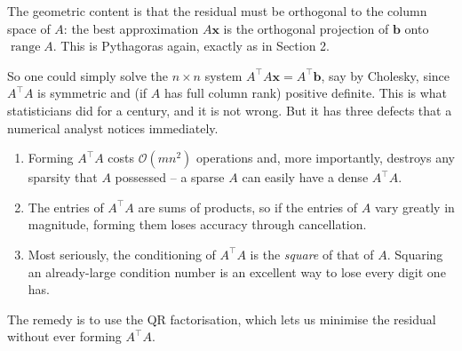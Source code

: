 The geometric content is that the residual must be orthogonal to the column space of $A$: the best approximation $A\mathbf x$ is the orthogonal projection of $\mathbf b$ onto $\operatorname{range}A$. This is Pythagoras again, exactly as in Section 2.

\begin{center}
\end{center}

So one could simply solve the $n\times n$ system $A^\top A\mathbf x = A^\top\mathbf b$, say by Cholesky, since $A^\top A$ is symmetric and (if $A$ has full column rank) positive definite. This is what statisticians did for a century, and it is not wrong. But it has three defects that a numerical analyst notices immediately.
\begin{enumerate}[label=(\roman*)]
  \item Forming $A^\top A$ costs $\mathcal{O}(mn^2)$ operations and, more importantly, destroys any sparsity that $A$ possessed -- a sparse $A$ can easily have a dense $A^\top A$.
  \item The entries of $A^\top A$ are sums of products, so if the entries of $A$ vary greatly in magnitude, forming them loses accuracy through cancellation.
  \item Most seriously, the conditioning of $A^\top A$ is the \emph{square} of that of $A$. Squaring an already-large condition number is an excellent way to lose every digit one has.
\end{enumerate}

The remedy is to use the QR factorisation, which lets us minimise the residual without ever forming $A^\top A$.

